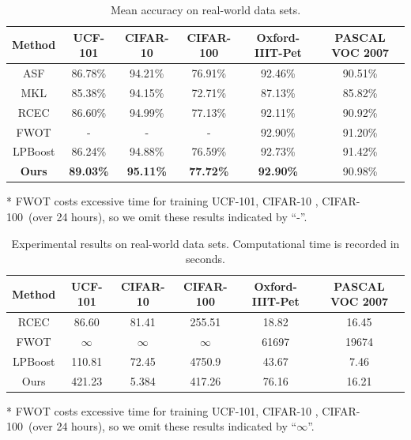 \documentclass[letterpaper]{article}
\begin{document}
\begin{table}[t]
\small
\centering
\caption{Mean accuracy on real-world data sets.}
\begin{tabular}{c|c|c|c|c|c}
\hline
Method              & UCF-101          & CIFAR-10         & CIFAR-100        & Oxford-IIIT-Pet & PASCAL VOC 2007    \\\hline
ASF                 & 86.78\%          & 94.21\%          & 76.91\%          & 92.46\%         &   90.51\%          \\
MKL                 & 85.38\%          & 94.15\%          & 72.71\%          & 87.13\%         &   85.82\%          \\
RCEC                & 86.60\%          & 94.99\%          & 77.13\%          & 92.11\%         &   90.92\%          \\
FWOT                & -                & -                & -                & 92.90\%         &   91.20\%          \\
LPBoost             & 86.24\%          & 94.88\%          & 76.59\%          & 92.73\%         &   91.42\%          \\\hline
\textbf{Ours}       & \textbf{89.03\%} & \textbf{95.11\%} & \textbf{77.72\%} & \textbf{92.90\%}&   90.98\%          \\
\hline
\end{tabular}
\begin{tablenotes}
\footnotesize
\item[*]
  FWOT costs excessive time for training UCF-101, CIFAR-10 , CIFAR-100~(over 24 hours), so we omit these results indicated by ``-''.
\end{tablenotes}
\label{table:total_acc}
\end{table}


\begin{table}[t]
\small
\centering
\caption{Experimental results on real-world data sets. Computational time is recorded in seconds.}
\begin{tabular}{c|c|c|c|c|c}
\hline
Method              & UCF-101    & CIFAR-10  & CIFAR-100  & Oxford-IIIT-Pet & PASCAL VOC 2007 \\\hline
RCEC                & 86.60      & 81.41     &  255.51    & 18.82           &   16.45         \\
FWOT                & $\infty$   & $\infty$  &  $\infty$     & 61697           &   19674         \\
LPBoost             & 110.81     & 72.45     &  4750.9    & 43.67           &   7.46          \\\hline
Ours                & 421.23     & 5.384     &  417.26    & 76.16           &   16.21         \\
\hline
\end{tabular}
\begin{tablenotes}
\footnotesize
\item[*]
  FWOT costs excessive time for training UCF-101, CIFAR-10 , CIFAR-100~(over 24 hours), so we omit these results indicated by ``$\infty$''.
\end{tablenotes}
\label{table:total_time}
\end{table}
\end{document}
